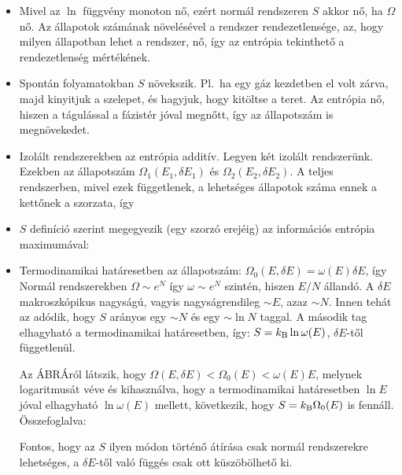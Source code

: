    \begin{itemize} 
    \item
     Mivel az $\ln$ függvény monoton nő, ezért normál rendszeren $S$ akkor nő, ha $\Omega$ nő. Az állapotok számának növelésével a rendszer rendezetlensége, az, hogy milyen állapotban lehet a rendszer, nő, így az entrópia tekinthető a rendezetlenség mértékének.
    
    \item
     Spontán folyamatokban $S$ növekszik. Pl.\ ha egy gáz kezdetben el volt zárva, majd kinyitjuk a szelepet, és hagyjuk, hogy kitöltse a teret. Az entrópia nő, hiszen a tágulással a fázistér jóval megnőtt, így az állapotszám is megnövekedet.
     
    \item
     Izolált rendszerekben az entrópia additív. Legyen két izolált rendszerünk. Ezekben az állapotszám $\Omega_1(E_1,\delta E_1)$ és $\Omega_2(E_2,\delta E_2)$. A teljes rendszerben, mivel ezek függetlenek, a lehetséges állapotok száma ennek a kettőnek a szorzata, így 
     
    \item
     $S$ definíció szerint megegyezik (egy szorzó erejéig) az információs entrópia maximumával:
     
    \item
     Termodinamikai határesetben az állapotszám: $\Omega_0(E,\delta E)=\omega(E)\delta E$, így
     Normál rendszerekben $\Omega\sim e^{N}$ így $\omega\sim e^{N}$ szintén, hiszen $E/N$ állandó. A $\delta E$ makroszkópikus nagyságú, vagyis nagyságrendileg $\sim E$, azaz $\sim N$. Innen tehát az adódik, hogy $S$ arányos egy $\sim N$ és egy $\sim\ln N$ taggal. A második tag elhagyható a termodinamikai határesetben, így: $S=k_\text{B}\ln\omega(E)$, $\delta E$-től függetlenül. 
     
     Az {\color{red} ÁBRÁ}ról látszik, hogy $\Omega(E,\delta E)<\Omega_0(E)<\omega(E)E$, melynek logaritmusát véve és kihasználva, hogy a termodinamikai határesetben $\ln E$ jóval elhagyható $\ln\omega(E)$ mellett, következik, hogy $S=k_\text{B}\Omega_0(E)$ is fennáll. Összefoglalva:
     
     Fontos, hogy az $S$ ilyen módon történő átírása csak normál rendszerekre lehetséges, a $\delta E$-től való függés csak ott küszöbölhető ki.
   \end{itemize}
   
